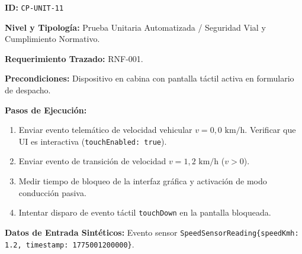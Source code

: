 \par\noindent\textbf{ID:} \texttt{C\allowbreak{}P\allowbreak{}-\allowbreak{}U\allowbreak{}N\allowbreak{}I\allowbreak{}T\allowbreak{}-\allowbreak{}1\allowbreak{}1\allowbreak{}}\par
\par\noindent\textbf{Nivel y Tipología:} Prueba Unitaria Automatizada / Seguridad Vial y Cumplimiento Normativo.\par
\par\noindent\textbf{Requerimiento Trazado:} RNF-001.\par
\par\noindent\textbf{Precondiciones:} Dispositivo en cabina con pantalla táctil activa en formulario de despacho.\par
\par\noindent\textbf{Pasos de Ejecución:} \par
\begin{enumerate}
\item Enviar evento telemático de velocidad vehicular \(v = 0{,}0\text{ km/h}\). Verificar que UI es interactiva (\texttt{t\allowbreak{}o\allowbreak{}u\allowbreak{}c\allowbreak{}h\allowbreak{}E\allowbreak{}n\allowbreak{}a\allowbreak{}b\allowbreak{}l\allowbreak{}e\allowbreak{}d\allowbreak{}:\allowbreak{} t\allowbreak{}r\allowbreak{}u\allowbreak{}e\allowbreak{}}).
\item Enviar evento de transición de velocidad \(v = 1{,}2\text{ km/h}\) (\(v > 0\)).
\item Medir tiempo de bloqueo de la interfaz gráfica y activación de modo conducción pasiva.
\item Intentar disparo de evento táctil \texttt{t\allowbreak{}o\allowbreak{}u\allowbreak{}c\allowbreak{}h\allowbreak{}D\allowbreak{}o\allowbreak{}w\allowbreak{}n\allowbreak{}} en la pantalla bloqueada.
\end{enumerate}
\par\noindent\textbf{Datos de Entrada Sintéticos:} Evento sensor \texttt{S\allowbreak{}p\allowbreak{}e\allowbreak{}e\allowbreak{}d\allowbreak{}S\allowbreak{}e\allowbreak{}n\allowbreak{}s\allowbreak{}o\allowbreak{}r\allowbreak{}R\allowbreak{}e\allowbreak{}a\allowbreak{}d\allowbreak{}i\allowbreak{}n\allowbreak{}g\allowbreak{}\{\allowbreak{}s\allowbreak{}p\allowbreak{}e\allowbreak{}e\allowbreak{}d\allowbreak{}K\allowbreak{}m\allowbreak{}h\allowbreak{}:\allowbreak{} 1\allowbreak{}.\allowbreak{}2\allowbreak{},\allowbreak{} t\allowbreak{}i\allowbreak{}m\allowbreak{}e\allowbreak{}s\allowbreak{}t\allowbreak{}a\allowbreak{}m\allowbreak{}p\allowbreak{}:\allowbreak{} 1\allowbreak{}7\allowbreak{}7\allowbreak{}5\allowbreak{}0\allowbreak{}0\allowbreak{}1\allowbreak{}2\allowbreak{}0\allowbreak{}0\allowbreak{}0\allowbreak{}0\allowbreak{}0\allowbreak{}\}\allowbreak{}}.\par
